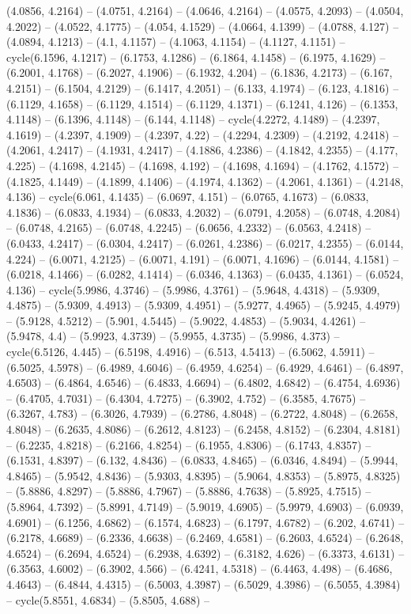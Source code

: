 (4.0856, 4.2164) -- (4.0751, 4.2164) -- (4.0646, 4.2164) -- (4.0575, 4.2093) -- (4.0504, 4.2022) -- (4.0522, 4.1775) -- (4.054, 4.1529) -- (4.0664, 4.1399) -- (4.0788, 4.127) -- (4.0894, 4.1213) -- (4.1, 4.1157) -- (4.1063, 4.1154) -- (4.1127, 4.1151) -- cycle(6.1596, 4.1217) -- (6.1753, 4.1286) -- (6.1864, 4.1458) -- (6.1975, 4.1629) -- (6.2001, 4.1768) -- (6.2027, 4.1906) -- (6.1932, 4.204) -- (6.1836, 4.2173) -- (6.167, 4.2151) -- (6.1504, 4.2129) -- (6.1417, 4.2051) -- (6.133, 4.1974) -- (6.123, 4.1816) -- (6.1129, 4.1658) -- (6.1129, 4.1514) -- (6.1129, 4.1371) -- (6.1241, 4.126) -- (6.1353, 4.1148) -- (6.1396, 4.1148) -- (6.144, 4.1148) -- cycle(4.2272, 4.1489) -- (4.2397, 4.1619) -- (4.2397, 4.1909) -- (4.2397, 4.22) -- (4.2294, 4.2309) -- (4.2192, 4.2418) -- (4.2061, 4.2417) -- (4.1931, 4.2417) -- (4.1886, 4.2386) -- (4.1842, 4.2355) -- (4.177, 4.225) -- (4.1698, 4.2145) -- (4.1698, 4.192) -- (4.1698, 4.1694) -- (4.1762, 4.1572) -- (4.1825, 4.1449) -- (4.1899, 4.1406) -- (4.1974, 4.1362) -- (4.2061, 4.1361) -- (4.2148, 4.136) -- cycle(6.061, 4.1435) -- (6.0697, 4.151) -- (6.0765, 4.1673) -- (6.0833, 4.1836) -- (6.0833, 4.1934) -- (6.0833, 4.2032) -- (6.0791, 4.2058) -- (6.0748, 4.2084) -- (6.0748, 4.2165) -- (6.0748, 4.2245) -- (6.0656, 4.2332) -- (6.0563, 4.2418) -- (6.0433, 4.2417) -- (6.0304, 4.2417) -- (6.0261, 4.2386) -- (6.0217, 4.2355) -- (6.0144, 4.224) -- (6.0071, 4.2125) -- (6.0071, 4.191) -- (6.0071, 4.1696) -- (6.0144, 4.1581) -- (6.0218, 4.1466) -- (6.0282, 4.1414) -- (6.0346, 4.1363) -- (6.0435, 4.1361) -- (6.0524, 4.136) -- cycle(5.9986, 4.3746) -- (5.9986, 4.3761) -- (5.9648, 4.4318) -- (5.9309, 4.4875) -- (5.9309, 4.4913) -- (5.9309, 4.4951) -- (5.9277, 4.4965) -- (5.9245, 4.4979) -- (5.9128, 4.5212) -- (5.901, 4.5445) -- (5.9022, 4.4853) -- (5.9034, 4.4261) -- (5.9478, 4.4) -- (5.9923, 4.3739) -- (5.9955, 4.3735) -- (5.9986, 4.373) -- cycle(6.5126, 4.445) -- (6.5198, 4.4916) -- (6.513, 4.5413) -- (6.5062, 4.5911) -- (6.5025, 4.5978) -- (6.4989, 4.6046) -- (6.4959, 4.6254) -- (6.4929, 4.6461) -- (6.4897, 4.6503) -- (6.4864, 4.6546) -- (6.4833, 4.6694) -- (6.4802, 4.6842) -- (6.4754, 4.6936) -- (6.4705, 4.7031) -- (6.4304, 4.7275) -- (6.3902, 4.752) -- (6.3585, 4.7675) -- (6.3267, 4.783) -- (6.3026, 4.7939) -- (6.2786, 4.8048) -- (6.2722, 4.8048) -- (6.2658, 4.8048) -- (6.2635, 4.8086) -- (6.2612, 4.8123) -- (6.2458, 4.8152) -- (6.2304, 4.8181) -- (6.2235, 4.8218) -- (6.2166, 4.8254) -- (6.1955, 4.8306) -- (6.1743, 4.8357) -- (6.1531, 4.8397) -- (6.132, 4.8436) -- (6.0833, 4.8465) -- (6.0346, 4.8494) -- (5.9944, 4.8465) -- (5.9542, 4.8436) -- (5.9303, 4.8395) -- (5.9064, 4.8353) -- (5.8975, 4.8325) -- (5.8886, 4.8297) -- (5.8886, 4.7967) -- (5.8886, 4.7638) -- (5.8925, 4.7515) -- (5.8964, 4.7392) -- (5.8991, 4.7149) -- (5.9019, 4.6905) -- (5.9979, 4.6903) -- (6.0939, 4.6901) -- (6.1256, 4.6862) -- (6.1574, 4.6823) -- (6.1797, 4.6782) -- (6.202, 4.6741) -- (6.2178, 4.6689) -- (6.2336, 4.6638) -- (6.2469, 4.6581) -- (6.2603, 4.6524) -- (6.2648, 4.6524) -- (6.2694, 4.6524) -- (6.2938, 4.6392) -- (6.3182, 4.626) -- (6.3373, 4.6131) -- (6.3563, 4.6002) -- (6.3902, 4.566) -- (6.4241, 4.5318) -- (6.4463, 4.498) -- (6.4686, 4.4643) -- (6.4844, 4.4315) -- (6.5003, 4.3987) -- (6.5029, 4.3986) -- (6.5055, 4.3984) -- cycle(5.8551, 4.6834) -- (5.8505, 4.688) -- 